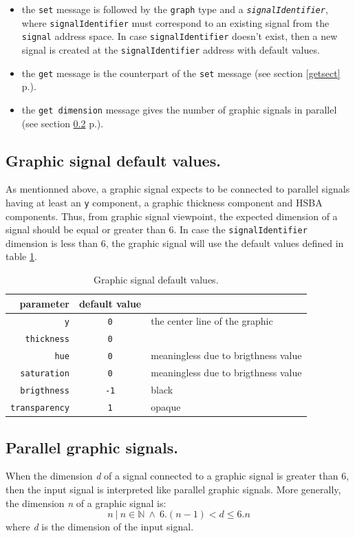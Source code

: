 \documentclass[a4paper,twoside]{report}
\newcommand{\subsublevel}[1]	{\subsection{#1}}
\newcommand{\fullref}[1]	{\ref{#1} p.\pageref{#1}}
\newcommand{\OSC}[1]		{\texttt{#1}}
\newcommand{\values}[1]	{\texttt{#1}}
\begin{document}
\begin{itemize}
\item the \OSC{set} message is followed by the \OSC{graph} type and a \OSC{\textit{signalIdentifier}}, where \OSC{signalIdentifier} must correspond to an existing signal from the \OSC{signal} address space. In case \OSC{signalIdentifier} doesn't exist, then a new signal is created at the \OSC{signalIdentifier} address with default values. 
\item the \OSC{get} message is the counterpart of the \OSC{set} message (see section \fullref{getsect}). 
\item the \OSC{get dimension} message gives the number of graphic signals in parallel (see section \fullref{pgsignal}). 
 \end{itemize}

\subsublevel{Graphic signal default values.}
As mentionned above, a graphic signal expects to be connected to parallel signals having at least an \values{y} component, a graphic thickness component and HSBA components. Thus, from graphic signal viewpoint, the expected dimension of a signal should be equal or greater than 6. In case the \OSC{signalIdentifier} dimension is less than 6, the graphic signal will use the default values defined in table \ref{gsigdefault}.

\begin{table}[htdp]
\caption{Graphic signal default values.}
\begin{center}
\begin{tabular}{|r|cl|}
\hline
parameter & default value & \\
\hline
\OSC{y}					& \OSC{0} & the center line of the graphic \\
\OSC{thickness}		& \OSC{0} & \\
\OSC{hue}				& \OSC{0} & meaningless due to brigthness value \\
\OSC{saturation}		& \OSC{0} & meaningless due to brigthness value \\
\OSC{brigthness}		& \OSC{-1} & black \\
\OSC{transparency}		& \OSC{1} & opaque \\
\hline
\end{tabular}
\end{center}
\label{gsigdefault}
\end{table}

\subsublevel{Parallel graphic signals.}
\label{pgsignal}
When the dimension \textit{d} of a signal connected to a graphic signal is greater than 6, then the input signal is interpreted like parallel graphic signals. More generally, the dimension \textit{n} of a graphic signal is:
\[
n  \  |\ n \in \mathbb{N}\ \land\ 6.(n-1) < d \leqslant 6.n
\]
where \textit{d} is the dimension of the input signal.
\end{document}
